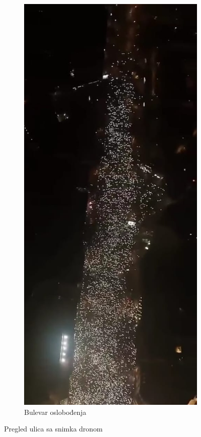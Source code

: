 \documentclass[a4paper,12pt]{article}
\begin{document}
\begin{figure}[H]
\begin{subfigure}[b]{0.3\textwidth}
	\end{subfigure}
	\hfill
	\begin{subfigure}[b]{0.3\textwidth}
	  \centering
	  \includegraphics[width=\textwidth]{../images/bulevar-oslobodjenja.jpeg}
	  \caption{Bulevar oslobođenja}
	  \label{fig:bulevar-oslobodjenja}
	\end{subfigure}
  
	\caption{Pregled ulica sa snimka dronom}
\end{figure}
\end{document}
